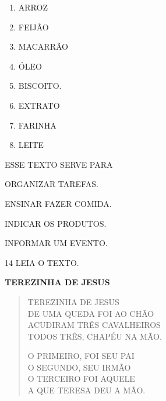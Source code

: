 \begin{escola}
{\begin{enumerate}
\item ARROZ

\item FEIJÃO

\item MACARRÃO

\item ÓLEO

\item BISCOITO.

\item EXTRATO

\item FARINHA

\item LEITE
\end{enumerate}

ESSE TEXTO SERVE PARA

\begin{escolha}
\item ORGANIZAR TAREFAS.

\item ENSINAR FAZER COMIDA.

\item INDICAR OS PRODUTOS.

\item INFORMAR UM EVENTO.
\end{escolha}


\num{14} LEIA O TEXTO.

\textbf{TEREZINHA DE JESUS}

\begin{verse}
TEREZINHA DE JESUS\\
DE UMA QUEDA FOI AO CHÃO\\
ACUDIRAM TRÊS CAVALHEIROS\\
TODOS TRÊS, CHAPÉU NA MÃO.

O PRIMEIRO, FOI SEU PAI\\
O SEGUNDO, SEU IRMÃO\\
O TERCEIRO FOI AQUELE\\
A QUE TERESA DEU A MÃO.


\end{verse}}
\end{escola}
